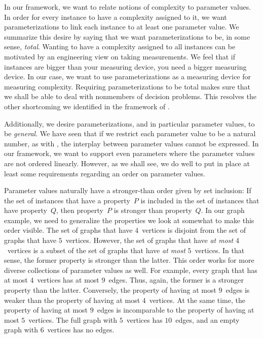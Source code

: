 In our framework, we want to relate notions of complexity to parameter values.
In order for every instance to have a complexity assigned to it, we want parameterizations to link each instance to at least one parameter value.
We summarize this desire by saying that we want parameterizations to be, in some sense, \emph{total}.
Wanting to have a complexity assigned to all instances can be motivated by an engineering view on taking measurements.
We feel that if instances are bigger than your measuring device, you need a bigger measuring device.
In our case, we want to use parameterizations as a measuring device for measuring complexity.
Requiring parameterizations to be total makes sure that we shall be able to deal with nonmembers of decision problems.
This resolves the other shortcoming we identified in the framework of \citeauthor{downey1999parameterized}.

Additionally, we desire parameterizations, and in particular parameter values, to be \emph{general}.
We have seen that if we restrict each parameter value to be a natural number, as with \citeauthor{flum2006parameterized}, the interplay between parameter values cannot be expressed.
In our framework, we want to support even parameters where the parameter values are not ordered linearly.
However, as we shall see, we do well to put in place at least some requirements regarding an order on parameter values.

Parameter values naturally have a stronger-than order given by set inclusion:
If the set of instances that have a property~$P$ is included in the set of instances that have property~$Q$, then property~$P$ is stronger than property~$Q$.
In our graph example, we need to generalize the properties we look at somewhat to make this order visible.
The set of graphs that have $4$~vertices is disjoint from the set of graphs that have $5$~vertices.
However, the set of graphs that have \emph{at most} $4$~vertices is a subset of the set of graphs that have \emph{at most} $5$~vertices.
In that sense, the former property is stronger than the latter.
This order works for more diverse collections of parameter values as well.
For example, every graph that has at most $4$~vertices has at most $9$~edges.
Thus, again, the former is a stronger property than the latter.
Conversely, the property of having at most $9$~edges is weaker than the property of having at most $4$~vertices.
At the same time, the property of having at most $9$~edges is incomparable to the property of having at most $5$~vertices.
The full graph with $5$~vertices has $10$~edges, and an empty graph with $6$~vertices has no edges.

